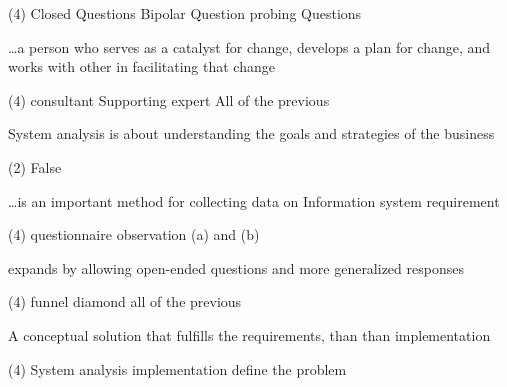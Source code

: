 \documentclass[10pt]{article}
\begin{document}
\begin{questions}
\begin{exercise}
        \begin{choice}(4)
            \choice Closed Questions
            \choice {}
            \choice Bipolar Question
            \choice probing Questions
        \end{choice}
    \end{exercise}
    \begin{exercise}
        \dots a person who serves as a catalyst for change, develops a plan for change, and works with other in facilitating that change
        \begin{choice}(4)
            \choice consultant
            \choice Supporting expert
            \choice {}
            \choice All of the previous
        \end{choice}
    \end{exercise}
    \begin{exercise}
        System analysis is about understanding the goals and strategies of the business
        \begin{choice}(2)
            \choice {}
            \choice False
        \end{choice}
    \end{exercise}
    \begin{exercise}
        \dots is an important method for collecting data on Information system requirement
        \begin{choice}(4)
            \choice questionnaire
            \choice observation
            \choice {}
            \choice (a) and (b)
        \end{choice}
    \end{exercise}
    \begin{exercise}
        expands by allowing open-ended questions and more generalized responses
        \begin{choice}(4)
            \choice {}
            \choice funnel
            \choice diamond
            \choice all of the previous
        \end{choice}
    \end{exercise}
    \begin{exercise}
        A conceptual solution that fulfills the requirements, than than implementation
        \begin{choice}(4)
            \choice System analysis
            \choice {}
            \choice implementation
            \choice define the problem
        \end{choice}

\end{exercise}
\end{questions}
\end{document}
